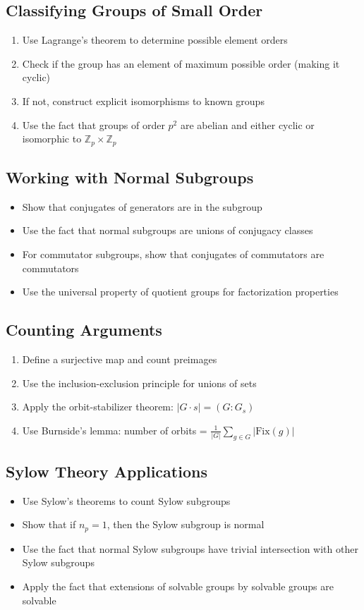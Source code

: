 \subsection*{Classifying Groups of Small Order}
\begin{enumerate}
\item Use Lagrange's theorem to determine possible element orders
\item Check if the group has an element of maximum possible order (making it cyclic)
\item If not, construct explicit isomorphisms to known groups
\item Use the fact that groups of order $p^2$ are abelian and either cyclic or isomorphic to $\mathbb{Z}_p \times \mathbb{Z}_p$
\end{enumerate}

\subsection*{Working with Normal Subgroups}
\begin{itemize}
\item Show that conjugates of generators are in the subgroup
\item Use the fact that normal subgroups are unions of conjugacy classes
\item For commutator subgroups, show that conjugates of commutators are commutators
\item Use the universal property of quotient groups for factorization properties
\end{itemize}

\subsection*{Counting Arguments}
\begin{enumerate}
\item Define a surjective map and count preimages
\item Use the inclusion-exclusion principle for unions of sets
\item Apply the orbit-stabilizer theorem: $|G \cdot s| = (G : G_s)$
\item Use Burnside's lemma: number of orbits = $\frac{1}{|G|} \sum_{g \in G} |\text{Fix}(g)|$
\end{enumerate}

\subsection*{Sylow Theory Applications}
\begin{itemize}
\item Use Sylow's theorems to count Sylow subgroups
\item Show that if $n_p = 1$, then the Sylow subgroup is normal
\item Use the fact that normal Sylow subgroups have trivial intersection with other Sylow subgroups
\item Apply the fact that extensions of solvable groups by solvable groups are solvable
\end{itemize}


